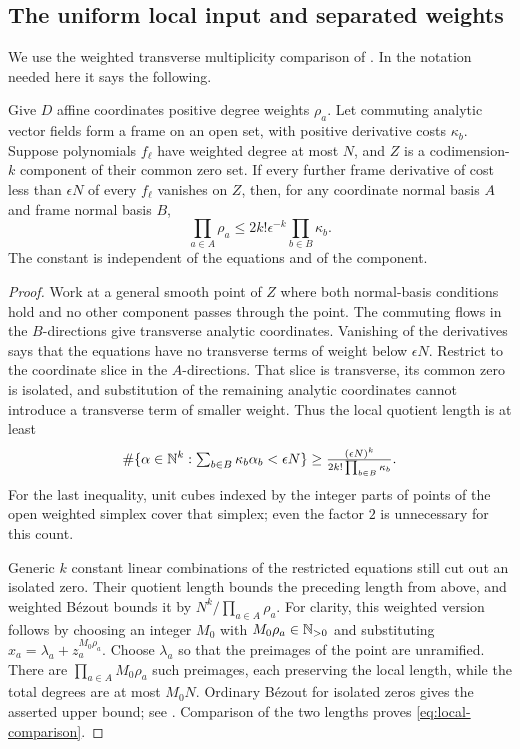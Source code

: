 \subsection{The uniform local input and separated weights}

We use the weighted transverse multiplicity comparison of
\cite[Lemma 2.2]{OAIpi}. In the notation needed here it says the following.

\begin{lemma}\label{lem:multiplicity}
Give \(D\) affine coordinates positive degree weights \(\rho_a\).
Let commuting analytic vector fields form a frame on an open set,
with positive derivative costs \(\kappa_b\).
Suppose polynomials \(f_\ell\) have weighted degree at most \(N\),
and \(Z\) is a codimension-\(k\) component of their common zero set.
If every further frame derivative of cost less than
\(\epsilon N\) of every \(f_\ell\) vanishes on \(Z\), then, for
any coordinate normal basis \(A\) and frame normal basis \(B\),
\begin{equation}\label{eq:local-comparison}
 \prod_{a\in A}\rho_a
 \le 2k!\epsilon^{-k}\prod_{b\in B}\kappa_b.
\end{equation}
The constant is independent of the equations and of the component.
\end{lemma}
\begin{proof}
Work at a general smooth point of \(Z\) where both normal-basis
conditions hold and no other component passes through the point.
The commuting flows in the \(B\)-directions give transverse analytic
coordinates. Vanishing of the derivatives says that the equations
have no transverse terms of weight below \(\epsilon N\).
Restrict to the coordinate slice in the \(A\)-directions.
That slice is transverse, its common zero is isolated, and substitution
of the remaining analytic coordinates cannot introduce a transverse
term of smaller weight.
Thus the local quotient length is at least
\[
 \#\{\alpha\in\mathbb N^k:\textstyle\sum_{b\in B}\kappa_b\alpha_b
                  <\epsilon N\}
 \ge \frac{(\epsilon N)^k}{2k!\prod_{b\in B}\kappa_b}.
\]
For the last inequality, unit cubes indexed by the integer parts of
points of the open weighted simplex cover that simplex; even the
factor \(2\) is unnecessary for this count.

Generic \(k\) constant linear combinations of the restricted equations
still cut out an isolated zero. Their quotient length bounds the
preceding length from above, and weighted B\'ezout bounds it by
\(N^k/\prod_{a\in A}\rho_a\).
For clarity, this weighted version follows by choosing an integer \(M_0\)
with \(M_0\rho_a\in\mathbb N_{>0}\) and substituting
\(x_a=\lambda_a+z_a^{M_0\rho_a}\). Choose \(\lambda_a\) so that
the preimages of the point are unramified. There are
\(\prod_{a\in A}M_0\rho_a\) such preimages, each preserving the
local length, while the total degrees are at most \(M_0N\).
Ordinary B\'ezout for isolated zeros gives the asserted upper bound;
see \cite[Corollary VIII.3]{Mondal2021}.
Comparison of the two lengths proves \eqref{eq:local-comparison}.
\end{proof}

